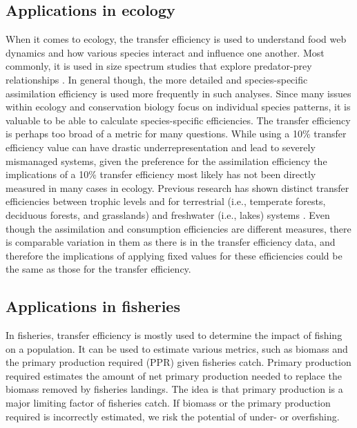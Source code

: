 \documentclass[oneside,12pt,final]{sty/ucthesis-CA2012}
\let\cite\citep                             %
\begin{document}
\begin{mainmatter}
\subsection*{Applications in ecology}
When it comes to ecology, the transfer efficiency is used to understand food web dynamics and how various species interact and influence one another. Most commonly, it is used in size spectrum studies that explore predator-prey relationships \cite{barnes2010global}. In general though, the more detailed and species-specific assimilation efficiency is used more frequently in such analyses. Since many issues within ecology and conservation biology focus on individual species patterns, it is valuable to be able to calculate species-specific efficiencies. The transfer efficiency is perhaps too broad of a metric for many questions. While using a 10\% transfer efficiency value can have drastic underrepresentation and lead to severely mismanaged systems, given the preference for the assimilation efficiency the implications of a 10\% transfer efficiency most likely has not been directly measured in many cases in ecology. Previous research has shown distinct transfer efficiencies between trophic levels and for terrestrial (i.e., temperate forests, deciduous forests, and grasslands) and freshwater (i.e., lakes) systems \cite{hairston1993causeeffect}. Even though the assimilation and consumption efficiencies are different measures, there is comparable variation in them as there is in the transfer efficiency data, and therefore the implications of applying fixed values for these efficiencies could be the same as those for the transfer efficiency.

\subsection*{Applications in fisheries}
In fisheries, transfer efficiency is mostly used to determine the impact of fishing on a population. It can be used to estimate various metrics, such as biomass and the primary production required (PPR) given fisheries catch. Primary production required estimates the amount of net primary production needed to replace the biomass removed by fisheries landings. The idea is that primary production is a major limiting factor of fisheries catch. If biomass or the primary production required is incorrectly estimated, we risk the potential of under- or overfishing. 

\vspace{5mm}


\end{mainmatter}
\end{document}
